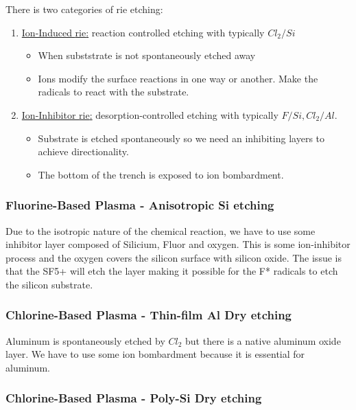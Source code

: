 \documentclass{report}
\begin{document}
There is two categories of \gls{rie} etching:

\begin{enumerate}
    \item \underline{Ion-Induced \gls{rie}:} reaction controlled etching with typically $Cl_2/Si$
    \begin{itemize}
        \item When subststrate is not spontaneously etched away
        \item Ions modify the surface reactions in one way or another. Make the radicals to react with the substrate.
    \end{itemize}
    \item \underline{Ion-Inhibitor \gls{rie}:} desorption-controlled etching with typically $F/Si, Cl_2/Al$.
    \begin{itemize}
        \item Substrate is etched spontaneously so we need an inhibiting layers to achieve directionality.
        \item The bottom of the trench is exposed to ion bombardment.
    \end{itemize}
\end{enumerate}

\subsubsection{Fluorine-Based Plasma - Anisotropic Si etching}

Due to the isotropic nature of the chemical reaction, we have to use some inhibitor layer composed of Silicium, Fluor and oxygen. This is some ion-inhibitor process and the oxygen covers the silicon surface with silicon oxide. The issue is that the SF5+ will etch the layer making it possible for the F* radicals to etch the silicon substrate.

\subsubsection{Chlorine-Based Plasma - Thin-film Al Dry etching}

Aluminum is spontaneously etched by $Cl_2$ but there is a native aluminum oxide layer. We have to use some ion bombardment because it is essential for aluminum.

\subsubsection{Chlorine-Based Plasma - Poly-Si Dry etching}
\end{document}
